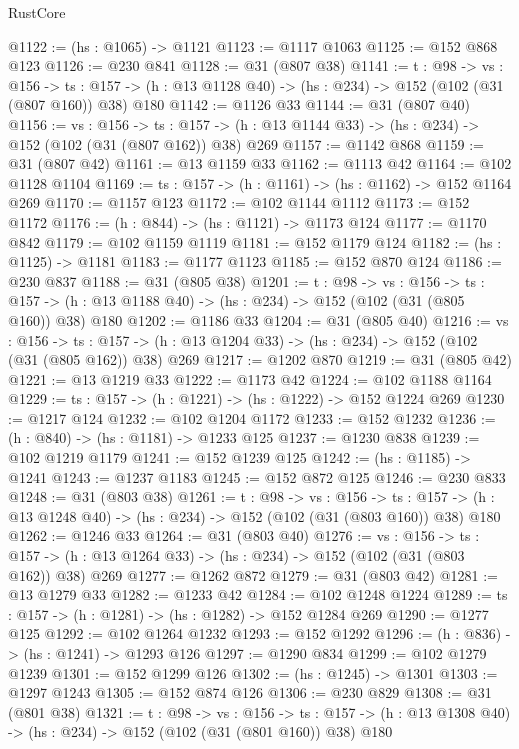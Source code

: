 \begin{lexlean}{RustCore}
\begin{coremodule}
@1122 := (hs : @1065) -> @1121
@1123 := @1117 @1063
@1125 := @152 @868 @123
@1126 := @230 @841
@1128 := @31 (@807 @38)
@1141 := {t : @98} ->
  {vs : @156} ->
  {ts : @157} -> (h : @13 @1128 @40) -> (hs : @234) -> @152 (@102 (@31 (@807 @160)) @38) @180
@1142 := @1126 @33
@1144 := @31 (@807 @40)
@1156 := {vs : @156} ->
  {ts : @157} -> (h : @13 @1144 @33) -> (hs : @234) -> @152 (@102 (@31 (@807 @162)) @38) @269
@1157 := @1142 @868
@1159 := @31 (@807 @42)
@1161 := @13 @1159 @33
@1162 := @1113 @42
@1164 := @102 @1128 @1104
@1169 := {ts : @157} -> (h : @1161) -> (hs : @1162) -> @152 @1164 @269
@1170 := @1157 @123
@1172 := @102 @1144 @1112
@1173 := @152 @1172
@1176 := (h : @844) -> (hs : @1121) -> @1173 @124
@1177 := @1170 @842
@1179 := @102 @1159 @1119
@1181 := @152 @1179 @124
@1182 := (hs : @1125) -> @1181
@1183 := @1177 @1123
@1185 := @152 @870 @124
@1186 := @230 @837
@1188 := @31 (@805 @38)
@1201 := {t : @98} ->
  {vs : @156} ->
  {ts : @157} -> (h : @13 @1188 @40) -> (hs : @234) -> @152 (@102 (@31 (@805 @160)) @38) @180
@1202 := @1186 @33
@1204 := @31 (@805 @40)
@1216 := {vs : @156} ->
  {ts : @157} -> (h : @13 @1204 @33) -> (hs : @234) -> @152 (@102 (@31 (@805 @162)) @38) @269
@1217 := @1202 @870
@1219 := @31 (@805 @42)
@1221 := @13 @1219 @33
@1222 := @1173 @42
@1224 := @102 @1188 @1164
@1229 := {ts : @157} -> (h : @1221) -> (hs : @1222) -> @152 @1224 @269
@1230 := @1217 @124
@1232 := @102 @1204 @1172
@1233 := @152 @1232
@1236 := (h : @840) -> (hs : @1181) -> @1233 @125
@1237 := @1230 @838
@1239 := @102 @1219 @1179
@1241 := @152 @1239 @125
@1242 := (hs : @1185) -> @1241
@1243 := @1237 @1183
@1245 := @152 @872 @125
@1246 := @230 @833
@1248 := @31 (@803 @38)
@1261 := {t : @98} ->
  {vs : @156} ->
  {ts : @157} -> (h : @13 @1248 @40) -> (hs : @234) -> @152 (@102 (@31 (@803 @160)) @38) @180
@1262 := @1246 @33
@1264 := @31 (@803 @40)
@1276 := {vs : @156} ->
  {ts : @157} -> (h : @13 @1264 @33) -> (hs : @234) -> @152 (@102 (@31 (@803 @162)) @38) @269
@1277 := @1262 @872
@1279 := @31 (@803 @42)
@1281 := @13 @1279 @33
@1282 := @1233 @42
@1284 := @102 @1248 @1224
@1289 := {ts : @157} -> (h : @1281) -> (hs : @1282) -> @152 @1284 @269
@1290 := @1277 @125
@1292 := @102 @1264 @1232
@1293 := @152 @1292
@1296 := (h : @836) -> (hs : @1241) -> @1293 @126
@1297 := @1290 @834
@1299 := @102 @1279 @1239
@1301 := @152 @1299 @126
@1302 := (hs : @1245) -> @1301
@1303 := @1297 @1243
@1305 := @152 @874 @126
@1306 := @230 @829
@1308 := @31 (@801 @38)
@1321 := {t : @98} ->
  {vs : @156} ->
  {ts : @157} -> (h : @13 @1308 @40) -> (hs : @234) -> @152 (@102 (@31 (@801 @160)) @38) @180

\end{coremodule}
\end{lexlean}

